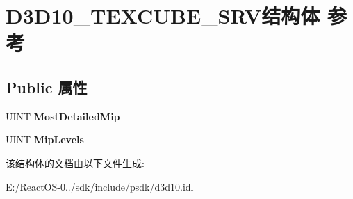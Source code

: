 \hypertarget{struct_d3_d10___t_e_x_c_u_b_e___s_r_v}{}\section{D3\+D10\+\_\+\+T\+E\+X\+C\+U\+B\+E\+\_\+\+S\+R\+V结构体 参考}
\label{struct_d3_d10___t_e_x_c_u_b_e___s_r_v}
\subsection*{Public 属性}
\begin{DoxyCompactItemize}
\item 
\mbox{\label{struct_d3_d10___t_e_x_c_u_b_e___s_r_v_afb2d9b7fe36e92503a9cd1fcf22aaa84}} 
U\+I\+NT {\bfseries Most\+Detailed\+Mip}
\item 
\mbox{\label{struct_d3_d10___t_e_x_c_u_b_e___s_r_v_a6265802628d1902fb8fec21f2bfa1203}} 
U\+I\+NT {\bfseries Mip\+Levels}
\end{DoxyCompactItemize}


该结构体的文档由以下文件生成\+:\begin{DoxyCompactItemize}
\item 
E\+:/\+React\+O\+S-\/0../sdk/include/psdk/d3d10.\+idl\end{DoxyCompactItemize}
